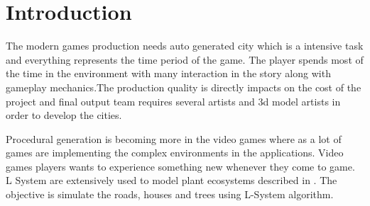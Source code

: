 \chapter{Introduction}

\Large The modern games production needs auto generated city which is a intensive task and everything represents the time period  of the game. The player spends most of the time in the environment with many interaction in the story along with gameplay mechanics\cite{abrahamcity}.The production quality is directly impacts on the cost of the project and final output team requires several artists and 3d model artists in order to develop the cities.

\vspace{0.5cm}

\Large Procedural generation is becoming more in the video games where as a lot of games are implementing the complex environments in the applications. Video games players wants to experience something new whenever they come to game. L System are extensively used to model plant ecosystems described in \cite{parish2001procedural}. The objective is simulate the roads, houses and trees using L-System algorithm. 


